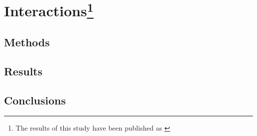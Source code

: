 \chapter[Interactions]{Interactions\protect\footnote{The results of this study have been published as \citep{T40}}}\label{ch:ms} %
\lipsum[1]
\section{Methods}
\lipsum[1-4]
\section{Results}
\lipsum[1-7]
\section{Conclusions}
\lipsum[1-3]
